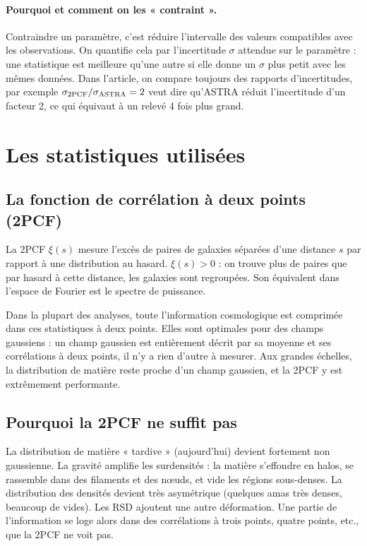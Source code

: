 \documentclass[11pt]{article}
\begin{document}
\paragraph{Pourquoi et comment on les « contraint ».} Contraindre un paramètre, c'est réduire l'intervalle des valeurs compatibles avec les observations. On quantifie cela par l'incertitude $\sigma$ attendue sur le paramètre : une statistique est meilleure qu'une autre si elle donne un $\sigma$ plus petit avec les mêmes données. Dans l'article, on compare toujours des rapports d'incertitudes, par exemple $\sigma_{\rm 2PCF}/\sigma_{\rm ASTRA}=2$ veut dire qu'ASTRA réduit l'incertitude d'un facteur 2, ce qui équivaut à un relevé 4 fois plus grand.

\section{Les statistiques utilisées}

\subsection{La fonction de corrélation à deux points (2PCF)}
La 2PCF $\xi(s)$ mesure l'excès de paires de galaxies séparées d'une distance $s$ par rapport à une distribution au hasard. $\xi(s)>0$ : on trouve plus de paires que par hasard à cette distance, les galaxies sont regroupées. Son équivalent dans l'espace de Fourier est le spectre de puissance.

Dans la plupart des analyses, toute l'information cosmologique est comprimée dans ces statistiques à deux points. Elles sont optimales pour des champs gaussiens : un champ gaussien est entièrement décrit par sa moyenne et ses corrélations à deux points, il n'y a rien d'autre à mesurer. Aux grandes échelles, la distribution de matière reste proche d'un champ gaussien, et la 2PCF y est extrêmement performante.

\subsection{Pourquoi la 2PCF ne suffit pas}
La distribution de matière « tardive » (aujourd'hui) devient fortement non gaussienne. La gravité amplifie les surdensités : la matière s'effondre en halos, se rassemble dans des filaments et des nœuds, et vide les régions sous-denses. La distribution des densités devient très asymétrique (quelques amas très denses, beaucoup de vides). Les RSD ajoutent une autre déformation. Une partie de l'information se loge alors dans des corrélations à trois points, quatre points, etc., que la 2PCF ne voit pas.
\end{document}
